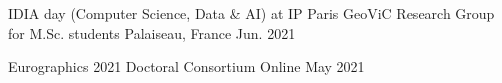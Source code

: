 \begin{cventries}



\cvtalk
    {IDIA day (Computer Science, Data \& AI) at IP Paris} %
    {GeoViC Research Group for M.Sc. students} %
    {Palaiseau, France} %
    {Jun. 2021} %

\cvtalk
    {Eurographics 2021} %
    {Doctoral Consortium} %
    {Online} %
    {May 2021} %

\end{cventries}